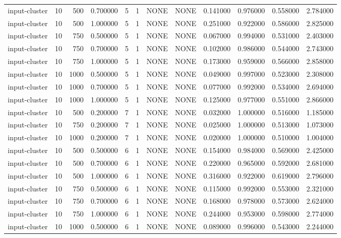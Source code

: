 \begin{tabular}{lrrrllllrrrr}
input-cluster & 10 & 500 & 0.700000 & 5 & 1 & NONE & NONE & 0.141000 & 0.976000 & 0.558000 & 2.784000 \\
input-cluster & 10 & 500 & 1.000000 & 5 & 1 & NONE & NONE & 0.251000 & 0.922000 & 0.586000 & 2.825000 \\
input-cluster & 10 & 750 & 0.500000 & 5 & 1 & NONE & NONE & 0.067000 & 0.994000 & 0.531000 & 2.403000 \\
input-cluster & 10 & 750 & 0.700000 & 5 & 1 & NONE & NONE & 0.102000 & 0.986000 & 0.544000 & 2.743000 \\
input-cluster & 10 & 750 & 1.000000 & 5 & 1 & NONE & NONE & 0.173000 & 0.959000 & 0.566000 & 2.858000 \\
input-cluster & 10 & 1000 & 0.500000 & 5 & 1 & NONE & NONE & 0.049000 & 0.997000 & 0.523000 & 2.308000 \\
input-cluster & 10 & 1000 & 0.700000 & 5 & 1 & NONE & NONE & 0.077000 & 0.992000 & 0.534000 & 2.694000 \\
input-cluster & 10 & 1000 & 1.000000 & 5 & 1 & NONE & NONE & 0.125000 & 0.977000 & 0.551000 & 2.866000 \\
input-cluster & 10 & 500 & 0.200000 & 7 & 1 & NONE & NONE & 0.032000 & 1.000000 & 0.516000 & 1.185000 \\
input-cluster & 10 & 750 & 0.200000 & 7 & 1 & NONE & NONE & 0.025000 & 1.000000 & 0.513000 & 1.073000 \\
input-cluster & 10 & 1000 & 0.200000 & 7 & 1 & NONE & NONE & 0.020000 & 1.000000 & 0.510000 & 1.004000 \\
input-cluster & 10 & 500 & 0.500000 & 6 & 1 & NONE & NONE & 0.154000 & 0.984000 & 0.569000 & 2.425000 \\
input-cluster & 10 & 500 & 0.700000 & 6 & 1 & NONE & NONE & 0.220000 & 0.965000 & 0.592000 & 2.681000 \\
input-cluster & 10 & 500 & 1.000000 & 6 & 1 & NONE & NONE & 0.316000 & 0.922000 & 0.619000 & 2.796000 \\
input-cluster & 10 & 750 & 0.500000 & 6 & 1 & NONE & NONE & 0.115000 & 0.992000 & 0.553000 & 2.321000 \\
input-cluster & 10 & 750 & 0.700000 & 6 & 1 & NONE & NONE & 0.168000 & 0.978000 & 0.573000 & 2.624000 \\
input-cluster & 10 & 750 & 1.000000 & 6 & 1 & NONE & NONE & 0.244000 & 0.953000 & 0.598000 & 2.774000 \\
input-cluster & 10 & 1000 & 0.500000 & 6 & 1 & NONE & NONE & 0.089000 & 0.996000 & 0.543000 & 2.244000 \\

\end{tabular}

